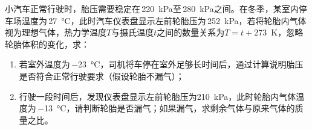 小汽车正常行驶时，胎压需要稳定在\,\qty{220}{kPa}至\,\qty{280}{kPa}之间。在冬季，某室内停车场温度为\,\qty{27}{\degreeCelsius}，此时汽车仪表盘显示左前轮胎压为\,\qty{252}{kPa}，若将轮胎内气体视为理想气体，热力学温度\(T\)与摄氏温度\(t\)之间的数量关系为\(T=t +\)\qty{273}{K}，忽略轮胎体积的变化，求：
\begin{enumerate}
    \item 若室外温度为\,\qty{-23}{\degreeCelsius}，司机将车停在室外足够长时间后，通过计算说明胎压是否符合正常行驶要求（假设轮胎不漏气）；
    \item 行驶一段时间后，发现仪表盘显示左前轮胎压为\qty{210}{kPa}，此时轮胎内气体温度为\,\qty{-13}{\degreeCelsius}，请判断轮胎是否漏气；如果漏气，求剩余气体与原来气体的质量之比。
\end{enumerate}